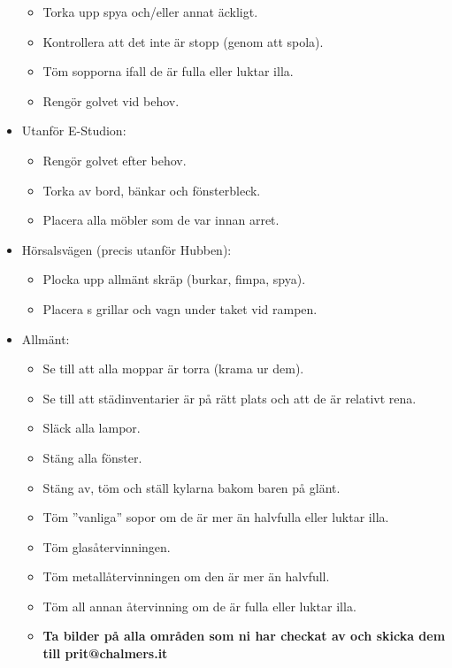 \begin{itemize}
   \begin{itemize}
     \item Torka upp spya och/eller annat äckligt.
     \item Kontrollera att det inte är stopp (genom att spola).
     \item Töm sopporna ifall de är fulla eller luktar illa.
     \item Rengör golvet vid behov. 
   \end{itemize}
   \item Utanför E-Studion:
   \begin{itemize}
     \item Rengör golvet efter behov.
     \item Torka av bord, bänkar och fönsterbleck.
     \item Placera alla möbler som de var innan arret.
   \end{itemize}
   \newpage
   \item Hörsalsvägen (precis utanför Hubben):
   \begin{itemize}
     \item Plocka upp allmänt skräp (burkar, fimpa, spya).
     \item Placera \prit{}s grillar och vagn under taket vid rampen.
   \end{itemize}
   \item Allmänt:
   \begin{itemize}
     \item Se till att alla moppar är torra (krama ur dem).
     \item Se till att städinventarier är på rätt plats och att de är relativt rena.
     \item Släck alla lampor.
     \item Stäng alla fönster.
     \item Stäng av, töm och ställ kylarna bakom baren på glänt.
     \item Töm ''vanliga'' sopor om de är mer än halvfulla eller luktar illa.
     \item Töm glasåtervinningen.
     \item Töm metallåtervinningen om den är mer än halvfull.
     \item Töm all annan återvinning om de är fulla eller luktar illa.
     \item \textbf{Ta bilder på alla områden som ni har checkat av och skicka dem till prit@chalmers.it}
   \end{itemize}
 \end{itemize}